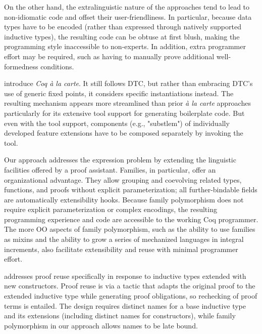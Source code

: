 On the other hand, the extra\-linguistic nature of the approaches tend
to lead to non-idiomatic code and offset their user-friendliness.
In particular, because data types have to be encoded (rather than expressed
through natively supported inductive types), the resulting code can be
obtuse at first blush, making the programming style inaccessible to non-experts.
In addition, extra programmer effort may be required, such as
having to manually prove additional well-formedness conditions. %

\citet{forsta2020} introduce \emph{Coq à la carte}.
It still follows DTC, but rather than embracing DTC's use of generic
fixed points, it considers specific instantiations instead.
The resulting mechanism appears more streamlined than prior \emph{à la
carte} approaches particularly for its extensive tool support for generating boilerplate code.
%
But even with the tool support, components (e.g., "substlem") of
individually developed feature extensions have to be composed separately
by invoking the tool.

Our approach addresses the expression problem by extending the
linguistic facilities offered by a proof assistant.
Families, in particular, offer an organizational advantage.  They allow
grouping and coevolving related types, functions, and proofs without
explicit parameterization;
all further-bindable fields are automatically extensibility hooks.
Because family polymorphism does not require explicit parameterization
or complex encodings,
the resulting programming experience and code are accessible to the
working Coq programmer.
The more OO aspects of family polymorphism, such as the ability to
use families as mixins and the ability to grow a series of mechanized
languages in integral increments, also facilitate extensibility and
reuse
with minimal programmer effort.


\citet{boite2004proof} addresses proof reuse specifically in response
to inductive types extended with new constructors. Proof reuse is
via a tactic that adapts the original proof to the extended inductive
type while generating proof obligations, so rechecking of proof terms is
entailed.
The design requires distinct names for a base inductive type and its
extensions (including distinct names for constructors), while family
polymorphism in our approach allows names to be late bound.

